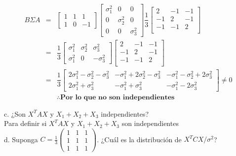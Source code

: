 \documentclass[12pt,a4paper]{report}
\begin{document}
\begin{enumerate}
		\begin{eqnarray*}
			B\Sigma A&=&\begin{bmatrix}
				1 & 1 & 1\\
				1 & 0 & -1
			\end{bmatrix}	
			\begin{bmatrix}
				\sigma^{2}_{1} & 0 & 0\\
				0 & \sigma^{2}_{2} & 0\\
				0 & 0 & \sigma^{2}_{3}
			\end{bmatrix}
\dfrac{1}{3}
			\begin{bmatrix}
			2 & -1 & -1\\
			-1 & 2 & -1\\
			-1 & -1 & 2\\
		\end{bmatrix}\\
		&=& \dfrac{1}{3}
		\begin{bmatrix}
			\sigma^{2}_{1} & \sigma^{2}_{2} & \sigma^{2}_{3}\\
			\sigma^{2}_{1} & 0 & -\sigma^{2}_{3}
		\end{bmatrix}
		\begin{bmatrix}
			2 & -1 & -1\\
			-1 & 2 & -1\\
			-1 & -1 & 2\\
		\end{bmatrix}\\
		&=&\dfrac{1}{3} \begin{bmatrix}
			2\sigma^{2}_{1}- \sigma^{2}_{2} - \sigma^{2}_{3} & -\sigma^{2}_{1}+2\sigma^{2}_{2} - \sigma^{2}_{3}  & -\sigma^{2}_{1} - \sigma^{2}_{2} + 2\sigma^{2}_{3}\\
			2\sigma^{2}_{1} +\sigma^{2}_{3}  & -\sigma^{2}_{1} +\sigma^{2}_{3}  & -\sigma^{2}_{1} -2\sigma^{2}_{3} 
		\end{bmatrix} \neq 0\\
		&&\therefore\textbf{Por lo que no son independientes}
	\end{eqnarray*} 

c. ¿Son $X^TAX$ y $X_1 + X_2 + X_3$ independientes?\\

	Para definir si $X^TAX$ y $X_1 + X_2 + X_3$ son independientes \\
	

d. Suponga $C = \frac{1}{3} \begin{pmatrix} 1 & 1 & 1 \\ 1 & 1 & 1 \\ 1 & 1 & 1 \end{pmatrix}$. ¿Cuál es la distribución de $X^TCX/\sigma^2$?\\



\end{enumerate}
\end{document}

